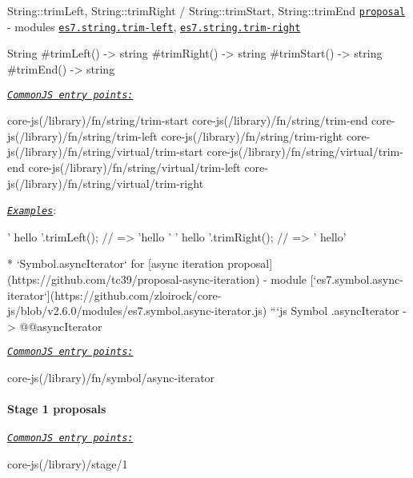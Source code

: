 \begin{DoxyItemize}
\item {\ttfamily String\+::trim\+Left}, {\ttfamily String\+::trim\+Right} / {\ttfamily String\+::trim\+Start}, {\ttfamily String\+::trim\+End} \href{https://github.com/sebmarkbage/ecmascript-string-left-right-trim}{\tt proposal} -\/ modules \href{https://github.com/zloirock/core-js/blob/v2.6.0/modules/es7.string.trim-right.js}{\tt {\ttfamily es7.\+string.\+trim-\/left}}, \href{https://github.com/zloirock/core-js/blob/v2.6.0/modules/es7.string.trim-right.js}{\tt {\ttfamily es7.\+string.\+trim-\/right}} 
\begin{DoxyCode}
String
  #trimLeft()  -> string
  #trimRight() -> string
  #trimStart() -> string
  #trimEnd()   -> string
\end{DoxyCode}
 \href{#commonjs}{\tt {\itshape Common\+JS entry points\+:}} 
\begin{DoxyCode}
core-js(/library)/fn/string/trim-start
core-js(/library)/fn/string/trim-end
core-js(/library)/fn/string/trim-left
core-js(/library)/fn/string/trim-right
core-js(/library)/fn/string/virtual/trim-start
core-js(/library)/fn/string/virtual/trim-end
core-js(/library)/fn/string/virtual/trim-left
core-js(/library)/fn/string/virtual/trim-right
\end{DoxyCode}
 \href{http://goo.gl/Er5lMJ}{\tt {\itshape Examples}}\+: 
\begin{DoxyCode}
'   hello   '.trimLeft();  // => 'hello   '
'   hello   '.trimRight(); // => '   hello'
\end{DoxyCode}
 
\begin{DoxyCode}
* `Symbol.asyncIterator` for [async iteration proposal](https://github.com/tc39/proposal-async-iteration) -
       module
       [`es7.symbol.async-iterator`](https://github.com/zloirock/core-js/blob/v2.6.0/modules/es7.symbol.async-iterator.js)
```js
Symbol
  .asyncIterator -> @@asyncIterator
\end{DoxyCode}
 \href{#commonjs}{\tt {\itshape Common\+JS entry points\+:}} 
\begin{DoxyCode}
core-js(/library)/fn/symbol/async-iterator
\end{DoxyCode}

\end{DoxyItemize}

\paragraph*{Stage 1 proposals}

\href{#commonjs}{\tt {\itshape Common\+JS entry points\+:}} 
\begin{DoxyCode}
core-js(/library)/stage/1
\end{DoxyCode}

